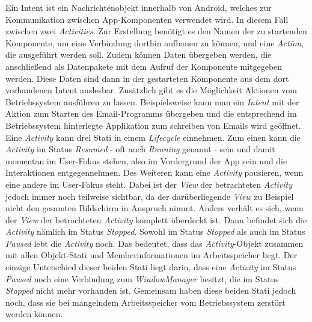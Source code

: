 Ein Intent ist ein Nachrichtenobjekt innerhalb von Android, welches zur Kommunikation zwischen App-Komponenten verwendet wird. In diesem Fall zwischen zwei \textit{Activities}. Zur Erstellung benötigt es den Namen der zu startenden Komponente, um eine Verbindung dorthin aufbauen zu können, und eine \textit{Action}, die ausgeführt werden soll. Zudem können Daten übergeben werden, die anschließend als Datenpakete mit dem Aufruf der Komponente mitgegeben werden. Diese Daten sind dann in der gestarteten Komponente aus dem dort vorhandenen Intent auslesbar. Zusätzlich gibt es die Möglichkeit Aktionen vom Betriebssystem ausführen zu lassen. Beispielsweise kann man ein \textit{Intent} mit der Aktion zum Starten des Email-Programms übergeben und die entsprechend im Betriebssystem hinterlegte Applikation zum schreiben von Emails wird geöffnet.\\
Eine \textit{Activity} kann drei Stati in einem \textit{Lifecycle} einnehmen. Zum einen kann die \textit{Activity} im Status \textit{Resumed} - oft auch \textit{Running} genannt - sein und damit momentan im User-Fokus stehen, also im Vordergrund der App sein und die Interaktionen entgegennehmen. Des Weiteren kann eine \textit{Activity} pausieren, wenn eine andere im User-Fokus steht. Dabei ist der \textit{View} der betrachteten \textit{Activity} jedoch immer noch teilweise sichtbar, da der darüberliegende \textit{View} zu Beispiel nicht den gesamten Bildschirm in Anspruch nimmt. Anders verhält es sich, wenn der \textit{View} der betrachteten \textit{Activity} komplett überdeckt ist. Dann befindet sich die \textit{Activity} nämlich im Status \textit{Stopped}. Sowohl im Status \textit{Stopped} als auch im Status \textit{Paused} lebt die \textit{Activity} noch. Das bedeutet, dass das \textit{Activity}-Objekt zusammen mit allen Objekt-Stati und Memberinformationen im Arbeitsspeicher liegt. Der einzige Unterschied dieser beiden Stati liegt darin, dass eine \textit{Activity} im Status \textit{Paused} noch eine Verbindung zum \textit{WindowManager} besitzt, die im Status \textit{Stopped} nicht mehr vorhanden ist. Gemeinsam haben diese beiden Stati jedoch noch, dass sie bei mangelndem Arbeitsspeicher vom Betriebssystem zerstört werden können. 
